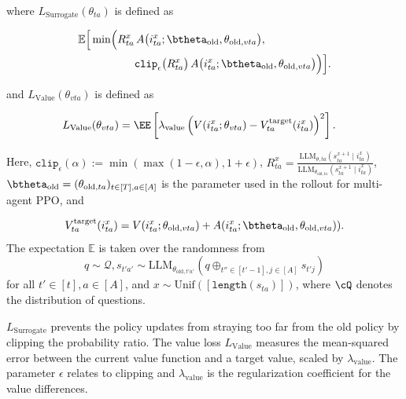 \noindent where $L_{\text{Surrogate}}(\theta_{ta})$ is defined as {

\safevspace{-5mm}

{\small \begin{align*}
\mathbb{E}\Bigl[
  &\min\Bigl(
    R_{ta}^x\,A\bigl(i_{ta}^x; \btheta_{\text{old}}, \theta_{\text{old},vta}\bigr), 
     \\
    &\qquad \qquad \texttt{clip}_{\epsilon}\bigl(R_{ta}^x\bigr)\,
    A\bigl(i_{ta}^x; \btheta_{\text{old}}, \theta_{\text{old},vta}\bigr)
  \Bigr)
\Bigr].
\end{align*}}
\safevspace{-7mm}

\noindent and $L_{\text{Value}}(\theta_{vta})$ is defined as 

\safevspace{-5mm}


{\small 
\begin{align*}
    &L_{\text{Value}}(\theta_{vta}) = \EE \left[\lambda_{\text{value}} \left(V(i_{ta}^x; \theta_{vta}) - V^\text{target}_{ta}(i_{ta}^x)\right)^2\right].
\end{align*}
} 
\safevspace{-5mm}

\noindent Here, $\texttt{clip}_{\epsilon}(\alpha) := \min(\max(1-\epsilon, \alpha), 1+\epsilon)$, \( R_{ta}^x = \frac{\text{LLM}_{\theta, ta}(s^{x+1}_{ta} \mid i_{ta}^{x})}{\text{LLM}_{\theta_{\text{old}, ta}}(s^{x+1}_{ta} \mid i_{ta}^{x})} \), \(\btheta_{\text{old}} = (\theta_{\text{old},{ta}})_{t\in[T], a \in [A]}\) is the parameter used in the rollout for multi-agent PPO, and 

\vspace{-3mm}
{\small \begin{align*}
    V_{ta}^{\text{target}}(i_{ta}^x) = V(i_{ta}^x; \theta_{\text{old}, vta}) + A(i_{ta}^x; \btheta_{\text{old}}, \theta_{\text{old}, vta})).
\end{align*}}
\noindent The expectation \( \mathbb{E} \) is taken over the randomness from \[q \sim \mathcal{Q}, s_{t'a'} \sim \text{LLM}_{\theta_{\text{old}, t'a'}}(q \oplus_{t'' \in [t'-1], j \in [A]} s_{t'j}) \] for all $t' \in [t], a \in [A]$, and $x \sim \text{Unif}([\texttt{length}(s_{ta})])$, where $\cQ$ denotes the distribution of questions.

$L_{\text{Surrogate}}$ prevents the policy updates from straying too far from the old policy by clipping the probability ratio. The value loss $L_{\text{Value}}$ measures the mean-squared error between the current value function and a target value, scaled by $\lambda_{\text{value}}$. The parameter \( \epsilon \) relates to clipping and \( \lambda_{\text{value}} \) is the regularization coefficient for the value differences.

}

